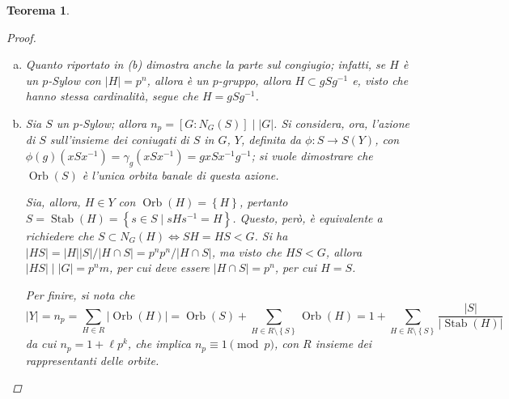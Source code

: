 \documentclass[11pt]{scrartcl}
\theoremstyle{style1}
\newtheorem{teorema}{Teorema}[section]
\numberwithin{equation}{subsection}
\begin{document}
\begin{teorema}
\begin{proof}
\begin{enumerate}[(a).]
				Si considera l'azione di $H$ su $G / S = X$ definita da
				\[
					\varphi : 
					\begin{array}
						{c c c}
						H &\longrightarrow & S(X)\\
						h&\longmapsto & \varphi _h
					\end{array}, \text{ con } \varphi _h(gS) = hgS
				\] 
				Per la formula delle classi:
				\[
				m = \lvert X \rvert = \sum_{g \in R}^{} \lvert \operatorname{Orb} (g S) \rvert = \sum_{g \in R}^{} \frac{\lvert H \rvert }{\lvert \operatorname{Stab} (gS) \rvert } = \sum_{g \in R}^{} p^{a _g} 
				\] 
				dove $R$ \`e l'insieme dei rappresentanti delle classi di $G/S$ e $a_g$ \`e un esponente dipendente dal $g$ in $R$.
				Visto che $p  \nmid m $\footnote{Questo \`e per assunzione, cio\`e $\lvert G \rvert =p^n m $ con $(p,m) = 1$.}, deve esistere un $g \in R$ tale che $a_g=0$, per cui $\operatorname{Orb} (gS) = \left\{ gS \right\} \Rightarrow \operatorname{Stab} (gS) = H$.
				Questo significa anche che $\forall h\in H, \ hgS = gS \Rightarrow H \subset gSg^{-1}$, ma $gSg^{-1}$ \`e un $p$-Sylow perch\'e $\lvert gSg^{-1} \rvert = \lvert S \rvert $, quindi $H$ \`e contenuto in un $p$-Sylow.
			\item Quanto riportato in (b) dimostra anche la parte sul congiugio; infatti, se $H$ \`e un $p$-Sylow con $\lvert H\rvert = p^n$, allora \`e un $p$-gruppo, allora $H \subset gSg^{-1}$ e, visto che hanno stessa cardinalit\`a, segue che $H = g S g^{-1}$.
			\item Sia $S$ un $p$-Sylow; allora $n_p = [G:N_G(S)]  \mid  |G|$.
				Si considera, ora, l'azione di $S$ sull'insieme dei coniugati di $S$ in $G$, $Y$, definita da $\phi :S \to S(Y)$, con $\phi (g)(xSx^{-1}) = \gamma_g (xSx^{-1}) = gxSx^{-1}g^{-1}$; si vuole dimostrare che $\operatorname{Orb} (S)$ \`e l'unica orbita banale di questa azione.

				Sia, allora, $H \in Y$ con $\operatorname{Orb} (H) = \left\{ H \right\} $, pertanto $S = \operatorname{Stab}(H) = \left\{ s \in S  \mid s H s^{-1} = H\right\}  $.
				Questo, per\`o, \`e equivalente a richiedere che $S \subset  N_G(H) \iff SH = HS < G$.
				Si ha $\lvert HS \rvert = \lvert H \rvert \lvert S \rvert  / \lvert H \cap S \rvert = p^np^n / \lvert H\cap S \rvert $, ma visto che $HS < G$, allora $\lvert HS \rvert  \mid |G| = p^nm$, per cui deve essere $\lvert H\cap S \rvert =p^n$, per cui $H = S$.

				Per finire, si nota che
				\[
				\lvert Y \rvert =n_p = \sum_{H \in R}^{} \lvert \operatorname{Orb} (H) \rvert = \operatorname{Orb} (S) + \sum_{H \in R \setminus\left\{ S \right\} }^{} \operatorname{Orb} (H) = 1 + \sum_{H \in R \setminus\left\{ S \right\} }^{} \frac{\lvert S \rvert }{\lvert \operatorname{Stab} (H) \rvert }
				\] 
				da cui $n_p = 1 + \ell p^k$, che implica $n_p \equiv 1 \pmod{p} $, con $R$ insieme dei rappresentanti delle orbite.
		\end{enumerate}
		
	\end{proof}
\end{teorema}
\end{document}
